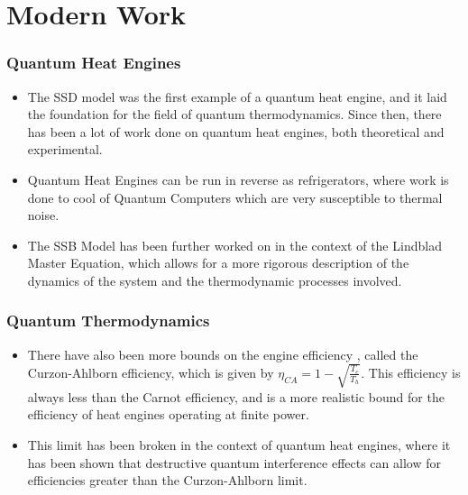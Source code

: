 \documentclass{beamer}
\begin{document}
    \section{Modern Work}

    \begin{frame}
        \frametitle{Quantum Heat Engines}
        \begin{itemize}
            \item The SSD model was the first example of a quantum heat engine, and it laid the foundation for the field of quantum thermodynamics. Since then, there has been a lot of work done on quantum heat engines, both theoretical and experimental. \pause
            \item Quantum Heat Engines can be run in reverse as refrigerators, where work is done to cool of Quantum Computers which are very susceptible to thermal noise. \pause
            \item The SSB Model has been further worked on in the context of the Lindblad Master Equation, which allows for a more rigorous description of the dynamics of the system and the thermodynamic processes involved. 
        \end{itemize}
    \end{frame}
    \begin{frame}
        \frametitle{Quantum Thermodynamics}
        \begin{itemize}
        
            \item There have also been more  bounds on the engine efficiency , called the Curzon-Ahlborn efficiency, which is given by $\eta_{CA} = 1 - \sqrt{\frac{T_c}{T_h}}$. This efficiency is always less than the Carnot efficiency, and is a more realistic bound for the efficiency of heat engines operating at finite power.
            \item This limit has been broken in the context of quantum heat engines, where it has been shown that destructive quantum interference effects can allow for efficiencies greater than the Curzon-Ahlborn limit.
        \end{itemize}
    \end{frame}
\end{document}

